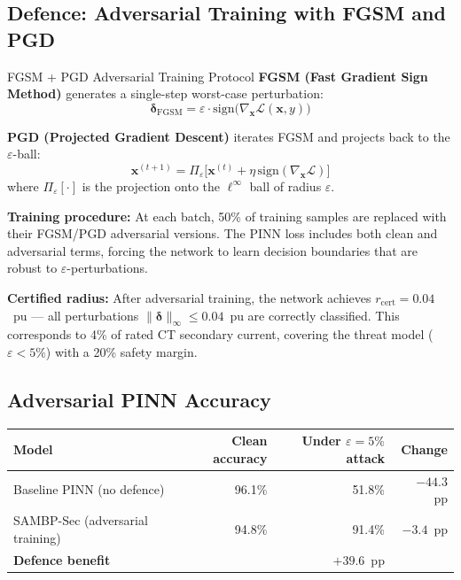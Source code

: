 \documentclass[12pt,a4paper]{article}
\begin{document}
\subsection{Defence: Adversarial Training with FGSM and PGD}

\begin{archbox}{FGSM + PGD Adversarial Training Protocol}
\textbf{FGSM (Fast Gradient Sign Method)} generates a single-step worst-case perturbation:
\[
  \bm{\delta}_\mathrm{FGSM} = \varepsilon \cdot \mathrm{sign}\!\bigl(\nabla_{\mathbf{x}} \mathcal{L}(\mathbf{x}, y)\bigr)
\]

\textbf{PGD (Projected Gradient Descent)} iterates FGSM and projects back to the $\varepsilon$-ball:
\[
  \mathbf{x}^{(t+1)} = \Pi_{\varepsilon}\!\bigl[\mathbf{x}^{(t)} + \eta\,\mathrm{sign}(\nabla_{\mathbf{x}} \mathcal{L})\bigr]
\]
where $\Pi_{\varepsilon}[\cdot]$ is the projection onto the $\ell^\infty$ ball of radius $\varepsilon$.

\textbf{Training procedure:} At each batch, 50\% of training samples are replaced with their FGSM/PGD adversarial versions. The PINN loss includes both clean and adversarial terms, forcing the network to learn decision boundaries that are robust to $\varepsilon$-perturbations.

\textbf{Certified radius:} After adversarial training, the network achieves $r_\mathrm{cert} = 0.04$~pu --- all perturbations $\|\bm{\delta}\|_\infty \leq 0.04$~pu are correctly classified. This corresponds to 4\% of rated CT secondary current, covering the threat model ($\varepsilon < 5\%$) with a 20\% safety margin.
\end{archbox}

\subsection{Adversarial PINN Accuracy}

\begin{center}
\begin{tabular}{@{}lrrr@{}}
\toprule
\textbf{Model} & \textbf{Clean accuracy} & \textbf{Under $\varepsilon=5\%$ attack} & \textbf{Change} \\
\midrule
Baseline PINN (no defence) & 96.1\% & 51.8\% & $-44.3$~pp \\
SAMBP-Sec (adversarial training) & 94.8\% & 91.4\% & $-3.4$~pp \\
\midrule
\textbf{Defence benefit} & & $+39.6$~pp & \\
\bottomrule
\end{tabular}
\end{center}
\end{document}
